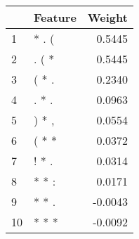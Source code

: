 \begin{tabular}{llr}
\toprule
{} & Feature &  Weight \\
\midrule
1  &   * . ( &  0.5445 \\
2  &   . ( * &  0.5445 \\
3  &   ( * . &  0.2340 \\
4  &   . * . &  0.0963 \\
5  &   ) * , &  0.0554 \\
6  &   ( * * &  0.0372 \\
7  &   ! * . &  0.0314 \\
8  &   * * : &  0.0171 \\
9  &   * * . & -0.0043 \\
10 &   * * * & -0.0092 \\
\bottomrule
\end{tabular}
